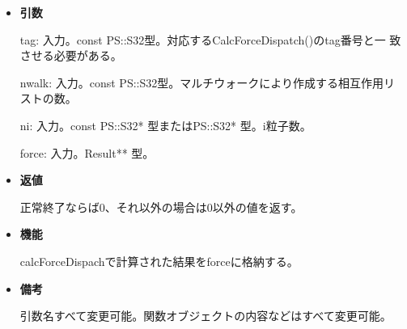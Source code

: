 \begin{itemize}

\item {\bf 引数}

  tag: 入力。const PS::S32型。対応するCalcForceDispatch()のtag番号と一
  致させる必要がある。
  
  nwalk: 入力。const PS::S32型。マルチウォークにより作成する相互作用リ
  ストの数。
  
  ni: 入力。const PS::S32* 型またはPS::S32* 型。i粒子数。

  force: 入力。Result** 型。
  
\item {\bf 返値}

  正常終了ならば0、それ以外の場合は0以外の値を返す。
  
\item {\bf 機能}

  calcForceDispachで計算された結果をforceに格納する。
  
\item {\bf 備考}

  引数名すべて変更可能。関数オブジェクトの内容などはすべて変更可能。
  
\end{itemize}

